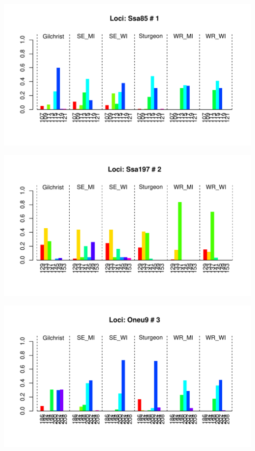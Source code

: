 \documentclass[a4paper]{scrartcl}\usepackage[]{graphicx}\usepackage[]{color}
\makeatletter
\def\maxwidth{ %
  \ifdim\Gin@nat@width>\linewidth
    \linewidth
  \else
    \Gin@nat@width
  \fi
}
\newenvironment{knitrout}{}{} %
\makeatother
\begin{document}
\begin{knitrout}
\color{fgcolor}
\includegraphics[width=\maxwidth]{PopGenReport_Hatchery-allelfreq-1} 

\includegraphics[width=\maxwidth]{PopGenReport_Hatchery-allelfreq-2} 

\includegraphics[width=\maxwidth]{PopGenReport_Hatchery-allelfreq-3} 


\end{knitrout}
\end{document}
